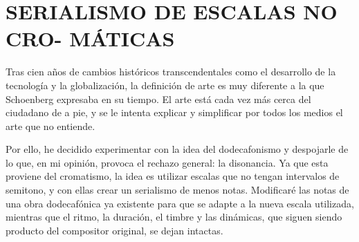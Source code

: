 	\section[SERIALISMO DE ESCALAS NO CROMÁTICAS]{SERIALISMO DE ESCALAS NO CRO- MÁTICAS}
	Tras cien años de cambios históricos transcendentales como el desarrollo de la tecnología y la globalización, la definición de arte es muy diferente a la que Schoenberg expresaba en su tiempo. El arte está cada vez más cerca del ciudadano de a pie, y se le intenta explicar y simplificar por todos los medios el arte que no entiende.
	
	Por ello, he decidido experimentar con la idea del dodecafonismo y despojarle de lo que, en mi opinión, provoca el rechazo general: la disonancia. Ya que esta proviene del cromatismo, la idea es utilizar escalas que no tengan intervalos de semitono, y con ellas crear un serialismo de menos notas. Modificaré las notas de una obra dodecafónica ya existente para que se adapte a la nueva escala utilizada, mientras que el ritmo, la duración, el timbre y las dinámicas, que siguen siendo producto del compositor original, se dejan intactas.